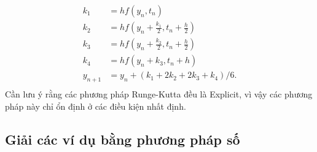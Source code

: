 \documentclass[a4paper]{article}
\begin{document}
\begin{equation}\label{eq:RK4}
\begin{aligned}
 	 	k_1     &= hf(y_n,t_n)	                \\
 	 	k_2     &= hf(y_n + \frac{k_1}{2}, t_n + \frac{h}{2})	        \\    
 	 	k_3     &= hf(y_n + \frac{k_2}{2}, t_n + \frac{h}{2})      \\
 	 	k_4     &= hf(y_n + k_3, t_n + h)	            \\
 	 	y_{n+1} &= y_n + (k_1 + 2k_2 + 2k_3 + k_4)/6.\\
\end{aligned}
\end{equation}
Cần lưu ý rằng các phương pháp Runge-Kutta đều là Explicit, vì vậy các phương pháp này chỉ ổn định ở các điều kiện nhất định.
\subsection{Giải các ví dụ bằng phương pháp số}
\end{document}
